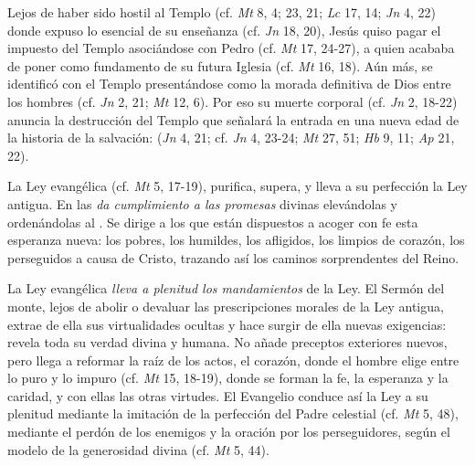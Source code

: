 \begin{ccebody}
 Lejos de haber sido hostil al Templo (cf. \textit{Mt} 8, 4; 23, 21; \textit{Lc} 17, 14; \textit{Jn} 4, 22) donde expuso lo esencial de su enseñanza (cf. \textit{Jn} 18, 20), Jesús quiso pagar el impuesto del Templo asociándose con Pedro (cf. \textit{Mt} 17, 24-27), a quien acababa de poner como fundamento de su futura Iglesia (cf. \textit{Mt} 16, 18). Aún más, se identificó con el Templo presentándose como la morada definitiva de Dios entre los hombres (cf. \textit{Jn} 2, 21; \textit{Mt} 12, 6). Por eso su muerte corporal (cf. \textit{Jn} 2, 18-22) anuncia la destrucción del Templo que señalará la entrada en una nueva edad de la historia de la salvación:  (\textit{Jn} 4, 21; cf. \textit{Jn} 4, 23-24; \textit{Mt} 27, 51; \textit{Hb} 9, 11; \textit{Ap} 21, 22).
\end{ccebody}


\begin{ccebody}
 La Ley evangélica  (cf. \textit{Mt} 5, 17-19), purifica, supera, y lleva a su perfección la Ley antigua. En las  \textit{da cumplimiento a las promesas} divinas elevándolas y ordenándolas al . Se dirige a los que están dispuestos a acoger con fe esta esperanza nueva: los pobres, los humildes, los afligidos, los limpios de corazón, los perseguidos a causa de Cristo, trazando así los caminos sorprendentes del Reino.

 La Ley evangélica \textit{lleva a plenitud los mandamientos} de la Ley. El Sermón del monte, lejos de abolir o devaluar las prescripciones morales de la Ley antigua, extrae de ella sus virtualidades ocultas y hace surgir de ella nuevas exigencias: revela toda su verdad divina y humana. No añade preceptos exteriores nuevos, pero llega a reformar la raíz de los actos, el corazón, donde el hombre elige entre lo puro y lo impuro (cf. \textit{Mt} 15, 18-19), donde se forman la fe, la esperanza y la caridad, y con ellas las otras virtudes. El Evangelio conduce así la Ley a su plenitud mediante la imitación de la perfección del Padre celestial (cf. \textit{Mt} 5, 48), mediante el perdón de los enemigos y la oración por los perseguidores, según el modelo de la generosidad divina (cf. \textit{Mt} 5, 44).
\end{ccebody}


